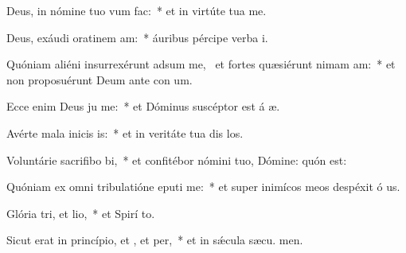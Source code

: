 \item Deus, in nómine tuo vum  fac:~* et in virtúte tua  me.
\item Deus, exáudi oratinem am:~* áuribus pércipe verba  i.
\item Quóniam aliéni insurrexérunt adsum me,~\pscross{} et fortes quæsiérunt nimam am:~* et non proposuérunt Deum ante con um.
\item Ecce enim Deus ju me:~* et Dóminus suscéptor est á æ.
\item Avérte mala inicis is:~* et in veritáte tua dis los.
\item Voluntárie sacrifibo bi,~* et confitébor nómini tuo, Dómine: quón  est:
\item Quóniam ex omni tribulatióne eputi me:~* et super inimícos meos despéxit ó us.
\item Glória tri, et lio,~* et Spirí to.
\item Sicut erat in princípio, et , et per,~* et in sǽcula sæcu. men.
